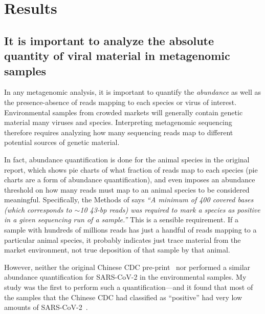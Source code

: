 \documentclass[9pt,twocolumn,twoside]{gsajnl_modified}
\begin{document}
\section{Results}

\subsection{It is important to analyze the absolute quantity of viral material in metagenomic samples}
In any metagenomic analysis, it is important to quantify the \emph{abundance} as well as the presence-absence of reads mapping to each species or virus of interest.
Environmental samples from crowded markets will generally contain genetic material many viruses and species.
Interpreting metagenomic sequencing therefore requires analyzing how many sequencing reads map to different potential sources of genetic material.

In fact, abundance quantification is done for the animal species in the original \citet{crits2023genetic} report, which shows pie charts of what fraction of reads map to each species (pie charts are a form of abundance quantification), and even imposes an abundance threshold on how many reads must map to an animal species to be considered meaningful.
Specifically, the Methods of \citet{crits2023genetic} says \textit{``A minimum of 400 covered bases (which corresponds to $\sim$10 43-bp reads) was required to mark a species as positive in a given sequencing run of a sample.''}
This is a sensible requirement.
If a sample with hundreds of millions reads has just a handful of reads mapping to a particular animal species, it probably indicates just trace material from the market environment, not true deposition of that sample by that animal.

However, neither the original Chinese CDC pre-print~\citep{liu2022surveillance} nor \citet{crits2023genetic} performed a similar abundance quantification for SARS-CoV-2 in the environmental samples.
My study was the first to perform such a quantification---and it found that most of the samples that the Chinese CDC had classified as ``positive''  had very low amounts of SARS-CoV-2~\citep{bloom2023association}.
\end{document}
